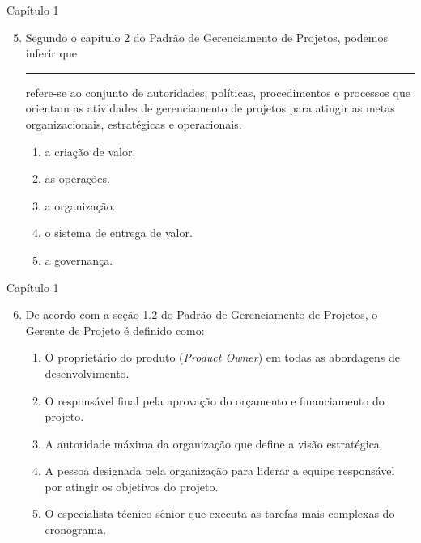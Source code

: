 \documentclass{beamer}
\begin{document}
\begin{frame}{Capítulo 1}
	\begin{enumerate}
		\setcounter{enumi}{4}
		\justifying
		\item Segundo o capítulo 2 do Padrão de Gerenciamento de Projetos, podemos inferir que \rule{50pt}{1pt} refere-se ao conjunto de autoridades, políticas, procedimentos e processos que orientam as atividades de gerenciamento de projetos para atingir as metas organizacionais, estratégicas e operacionais.
		\begin{enumerate}[a]
			\item a criação de valor.
			\item as operações.
			\item a organização.
			\item o sistema de entrega de valor.
			\item \alert<2>{a governança}.
		\end{enumerate}
	\end{enumerate}
\end{frame}

\begin{frame}{Capítulo 1}
	\begin{enumerate}
		\setcounter{enumi}{5}
		\justifying
		\item De acordo com a seção 1.2 do Padrão de Gerenciamento de Projetos, o Gerente de Projeto é definido como:
		\begin{enumerate}[a]
			\justifying
			\item O proprietário do produto (\textit{Product Owner}) em todas as abordagens de desenvolvimento.
			\item O responsável final pela aprovação do orçamento e financiamento do projeto.
			\item A autoridade máxima da organização que define a visão estratégica.
			\item \alert<2>{A pessoa designada pela organização para liderar a equipe responsável por atingir os objetivos do projeto}.
			\item O especialista técnico sênior que executa as tarefas mais complexas do cronograma.
		\end{enumerate}
	\end{enumerate}
\end{frame}
\end{document}
